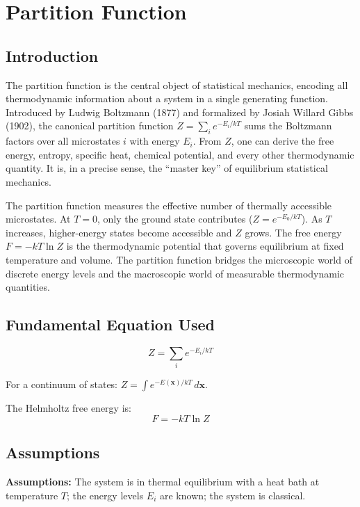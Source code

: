 \chapter{Partition Function}

\section*{Introduction}

The partition function is the central object of statistical mechanics, encoding all thermodynamic information about a system in a single generating function. Introduced by Ludwig Boltzmann (1877) and formalized by Josiah Willard Gibbs (1902), the canonical partition function $Z = \sum_{i} e^{-E_{i}/kT}$ sums the Boltzmann factors over all microstates $i$ with energy $E_{i}$. From $Z$, one can derive the free energy, entropy, specific heat, chemical potential, and every other thermodynamic quantity. It is, in a precise sense, the ``master key'' of equilibrium statistical mechanics.

The partition function measures the effective number of thermally accessible microstates. At $T = 0$, only the ground state contributes ($Z = e^{-E_{0}/kT}$). As $T$ increases, higher-energy states become accessible and $Z$ grows. The free energy $F = -kT\ln Z$ is the thermodynamic potential that governs equilibrium at fixed temperature and volume. The partition function bridges the microscopic world of discrete energy levels and the macroscopic world of measurable thermodynamic quantities.
\section*{Fundamental Equation Used}

\begin{equation}
\boxed{\; Z = \sum_{i} e^{-E_{i}/kT}\;}
\label{eq:partition-function}
\end{equation}

For a continuum of states: $Z = \int e^{-E(\mathbf{x})/kT}\,d\mathbf{x}$.

The Helmholtz free energy is:
\begin{equation}
F = -kT\ln Z
\label{eq:free-energy}
\end{equation}
\section*{Assumptions}

\textbf{Assumptions:} The system is in thermal equilibrium with a heat bath at temperature $T$; the energy levels $E_{i}$ are known; the system is classical.


